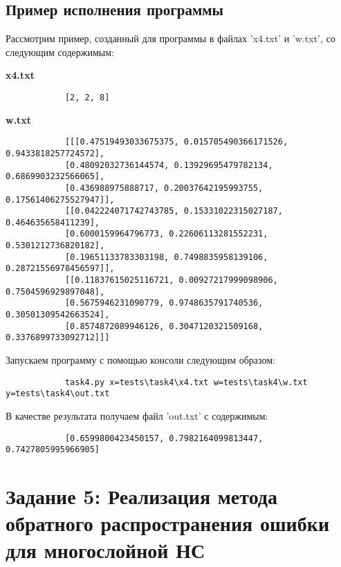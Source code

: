 \documentclass[bachelor, och, report]{../shiza}
\begin{document}

    \subsection{Пример исполнения программы}

        Рассмотрим пример, созданный для программы в файлах 'x4.txt' и 'w.txt',
        со следующим содержимым:

        \textbf{x4.txt}
        \begin{verbatim}
            [2, 2, 8]
        \end{verbatim}
        
        \textbf{w.txt}
        \begin{verbatim}
            [[[0.47519493033675375, 0.015705490366171526, 0.9433818257724572],
            [0.48092032736144574, 0.13929695479782134, 0.6869903232566065],
            [0.436988975888717, 0.20037642195993755, 0.17561406275527947]],
            [[0.042224071742743785, 0.15331022315027187, 0.464635658411239],
            [0.6000159964796773, 0.22606113281552231, 0.5301212736820182],
            [0.19651133783303198, 0.7498835958139106, 0.28721556978456597]],
            [[0.11837615025116721, 0.00927217999098906, 0.7504596929897048],
            [0.5675946231090779, 0.9748635791740536, 0.30501309542663524],
            [0.8574872089946126, 0.3047120321509168, 0.3376899733092712]]]
        \end{verbatim}

        Запускаем программу с помощью консоли следующим образом:

        \begin{verbatim}
            task4.py x=tests\task4\x4.txt w=tests\task4\w.txt y=tests\task4\out.txt
        \end{verbatim}

        В качестве результата получаем файл 'out.txt' с содержимым:

        \begin{verbatim}
            [0.6599800423450157, 0.7982164099813447, 0.7427805995966905]
        \end{verbatim}

\section{Задание 5: Реализация метода обратного распространения ошибки для многослойной НС}
\end{document}
